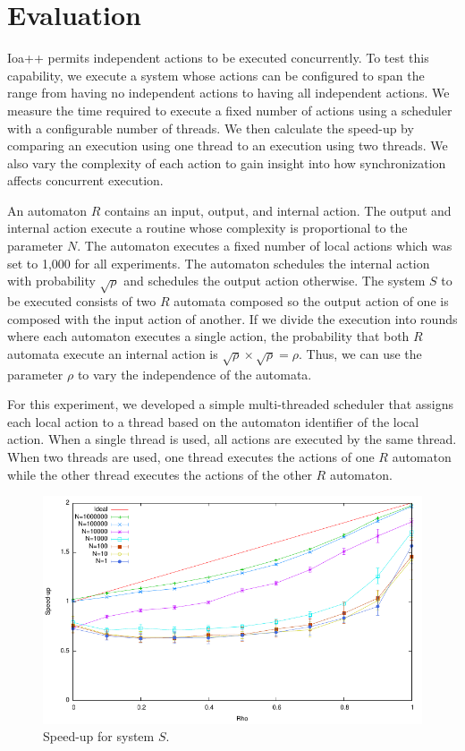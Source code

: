 \section{Evaluation\label{evaluation}}

Ioa++ permits independent actions to be executed concurrently.
To test this capability, we execute a system whose actions can be configured to span the range from having no independent actions to having all independent actions.
We measure the time required to execute a fixed number of actions using a scheduler with a configurable number of threads.
We then calculate the speed-up by comparing an execution using one thread to an execution using two threads.
We also vary the complexity of each action to gain insight into how synchronization affects concurrent execution.

An automaton $R$ contains an input, output, and internal action.
The output and internal action execute a routine whose complexity is proportional to the parameter $N$.
The automaton executes a fixed number of local actions which was set to 1,000 for all experiments.
The automaton schedules the internal action with probability $\sqrt{\rho}$ and schedules the output action otherwise.
The system $S$ to be executed consists of two $R$ automata composed so the output action of one is composed with the input action of another.
If we divide the execution into rounds where each automaton executes a single action, the probability that both $R$ automata execute an internal action is $\sqrt{\rho} \times \sqrt{\rho} = \rho$.
Thus, we can use the parameter $\rho$ to vary the independence of the automata.

For this experiment, we developed a simple multi-threaded scheduler that assigns each local action to a thread based on the automaton identifier of the local action.
When a single thread is used, all actions are executed by the same thread.
When two threads are used, one thread executes the actions of one $R$ automaton while the other thread executes the actions of the other $R$ automaton.

\begin{figure}
\center
\includegraphics[width=\columnwidth]{speed_up}
\caption{Speed-up for system $S$.\label{speed_up}}
\end{figure}

